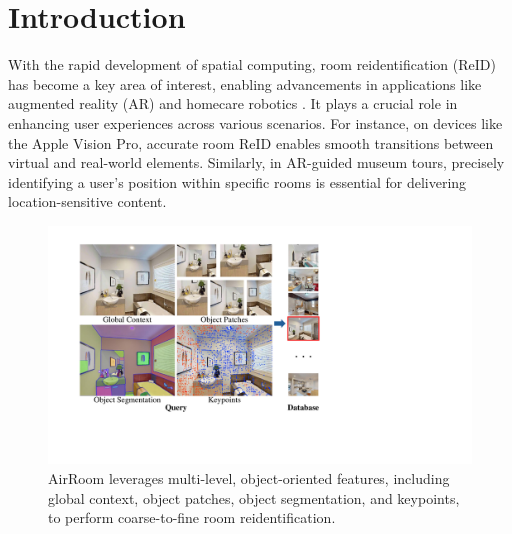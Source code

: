 \vspace{-5pt}
\section{Introduction}
\label{sec:intro}
\vspace{-2pt}

With the rapid development of spatial computing, room reidentification (ReID) has become a key area of interest, enabling advancements in applications like augmented reality (AR) \cite{schult2023controlroom3droomgenerationusing} and homecare robotics \cite{sarch2022tideetidyingnovelrooms}. It plays a crucial role in enhancing user experiences across various scenarios. 
For instance, on devices like the Apple Vision Pro, accurate room ReID enables smooth transitions between virtual and real-world elements. 
Similarly, in AR-guided museum tours, precisely identifying a user’s position within specific rooms is essential for delivering location-sensitive content.

\begin{figure}[ht]
    \centering
    \includegraphics[width=\columnwidth]{object_information_font.pdf}
    \vspace{-20pt}
    \caption{AirRoom leverages multi-level, object-oriented features, including global context, object patches, object segmentation, and keypoints, to perform coarse-to-fine room reidentification.}
    \vspace{-20pt}
    \label{fig:example_image}
\end{figure}

